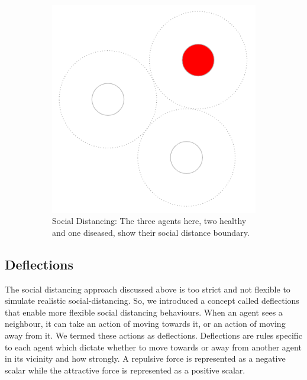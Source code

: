 \documentclass[a4paper,11pt]{article}
\begin{document}
\begin{figure}[ht]
\begin{subfigure}[b]{0.3\linewidth}
            \includegraphics[width=\linewidth]{diagrams/social_distancing.PNG}
            \caption{Social Distancing: The three agents here, two healthy and one diseased, show their social distance boundary.}
            \label{fig:3.1b}
        \end{subfigure}
        \caption{}
    \end{figure}

    \subsection{Deflections}
    The social distancing approach discussed above is too strict and not flexible to simulate realistic social-distancing. So, we introduced a concept called deflections that enable more flexible social distancing behaviours. When an agent sees a neighbour, it can take an action of moving towards it, or an action of moving away from it. We termed these actions as deflections. Deflections are rules specific to each agent which dictate whether to move towards or away from another agent in its vicinity and how strongly. A repulsive force is represented as a negative scalar while the attractive force is represented as a positive scalar.
\end{document}

